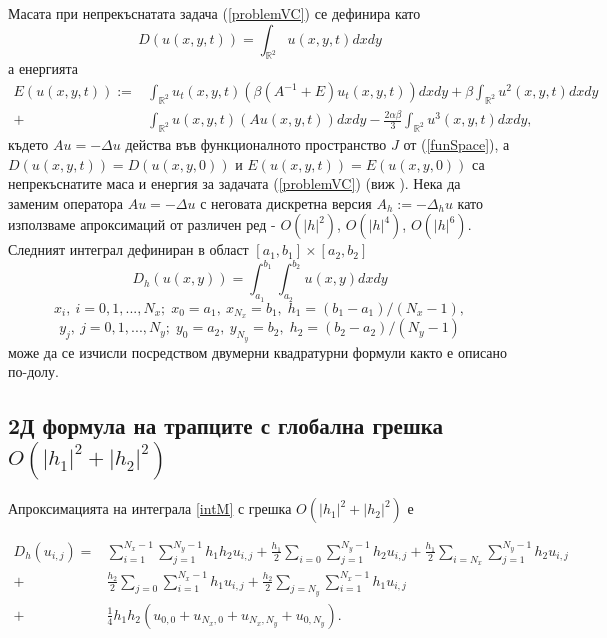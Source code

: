 \documentclass{article}
\newcommand{\rf}[1]{(\ref{#1})}
\newcommand{\RR}{\mathbb{R}}
\begin{document}
Масата при непрекъснатата задача \rf{problemVC} се дефинира като
\begin{equation}\label{intM}
D(u(x,y,t))=\int_{\RR^2} u(x,y,t)dx dy
\end{equation}
а енергията 
\begin{align}\label{ex-en}
E(u(x,y,t)):=&\int_{\RR^2} u_t(x,y,t) \left(\beta(A^{-1}+E)u_t(x,y,t)\right) dxdy+
\beta \int_{\RR^2} u^2(x,y,t) dxdy \nonumber\\
+& \int_{\RR^2}u(x,y,t) \left(A u(x,y,t)\right) dxdy
-\frac{2 \alpha \beta}{3} \int_{\RR^2} u^3(x,y,t) dxdy,
\end{align}
където $Au=-\Delta u$ действа във функционалното пространство $J$ от \rf{funSpace}, а $D(u(x,y,t)) = D(u(x,y,0))$ и $E(u(x,y,t)) = E(u(x,y,0))$ са непрекъснатите маса и енергия за задачата \rf{problemVC} (виж \cite{ref1}). Нека да заменим оператора $Au=-\Delta u$ с неговата дискретна версия $A_h :=-\Delta_h u$ като използваме апроксимаций от различен ред - $O(|h|^2)$, $O(|h|^4)$, $O(|h|^6)$.
Следният интеграл дефиниран в област $[a_1, b_1] \times [a_2, b_2]$
\begin{equation}\label{int}
D_h(u(x,y))=\int_{a_1}^{b_1} \int_{a_2}^{b_2} u(x,y)dx dy
\end{equation}
$$x_i, ~i=0,1,...,N_x; \;x_0=a_1,~x_{N_x}=b_1, \;h_1=(b_1-a_1)/(N_x-1),$$
$$y_j, ~j=0,1,...,N_y; \; y_0=a_2,~y_{N_y}=b_2, \;h_2=(b_2-a_2)/(N_y-1)$$
може да се изчисли посредством двумерни квадратурни формули както е описано по-долу.

\subsection{ 2Д формула на трапците с глобална грешка $O(|h_1|^2+|h_2|^2)$ }

Апроксимацията на интеграла \eqref{intM} с грешка $O(|h_1|^2+|h_2|^2)$ е

\begin{align}\label{quadr2}
D_h(u_{i,j}) =& \sum_{i=1}^{N_x-1} \sum_{j=1}^{N_y-1} h_1 h_2 u_{i,j}
+\frac{h_1}{2}\sum_{i=0} \sum_{j=1}^{N_y-1} h_2 u_{i,j}
+\frac{h_1}{2}\sum_{i=N_x} \sum_{j=1}^{N_y-1} h_2 u_{i,j} \nonumber\\
+&\frac{h_2}{2}\sum_{j=0} \sum_{i=1}^{N_x-1} h_1 u_{i,j}
+\frac{h_2}{2}\sum_{j=N_y} \sum_{i=1}^{N_x-1} h_1 u_{i,j}
\nonumber\\
+&\frac{1}{4}h_1 h_2 \left(u_{0,0}+u_{N_x,0}+u_{N_x,N_y}+u_{0,N_y}
\right).
\end{align}
\end{document}
